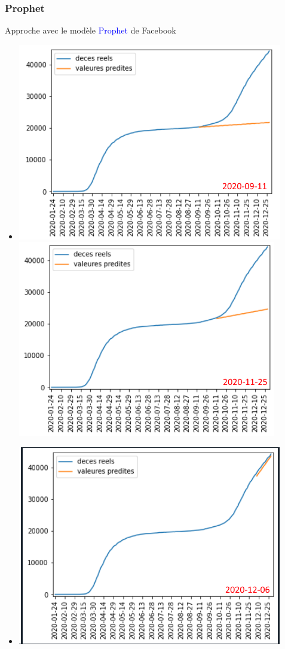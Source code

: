\documentclass{beamer}[aspectratio = 43]
\begin{document}
\begin{frame}
	\frametitle{Prophet}
	Approche avec le modèle \textcolor{blue}{Prophet} de Facebook
	\begin{itemize}
		\centering
		\item[]\includegraphics[scale=0.4]{prophet_bpt}
		\includegraphics[scale=0.4]{prophet_mpt}
		\item[]\includegraphics[scale=0.4]{prophet_ppt}
	\end{itemize}
\end{frame}
\end{document}
